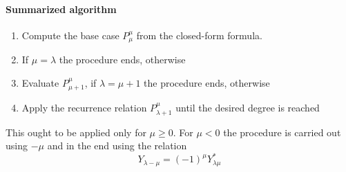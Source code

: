 \paragraph{Summarized algorithm}
\begin{enumerate}
    \item Compute the base case $P_\mu^\mu$ from the closed-form formula.
    \item If $\mu = \lambda$ the procedure ends, otherwise
    \item Evaluate $P_{\mu+1}^\mu$, if $\lambda = \mu +1$ the procedure ends, otherwise
    \item Apply the recurrence relation $P_{\lambda+1}^\mu$ until the desired degree is reached
\end{enumerate}
This ought to be applied only for $ \mu \ge 0$. For $\mu < 0$ the procedure is carried out using $-\mu$ and in the end using the relation
\begin{equation}
    Y_{\lambda-\mu} = (-1)^{\mu}Y_{\lambda\mu}^{*}
\end{equation}

